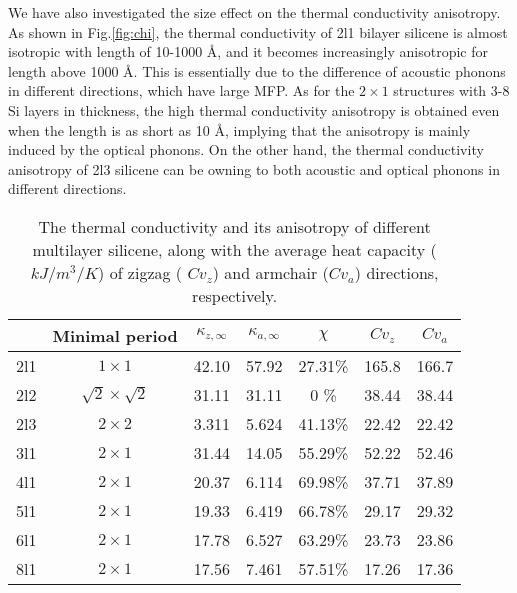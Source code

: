 \documentclass[aps,prb,twocolumn,showpacs,amsmath,amssymb]{revtex4-1}
\newcommand{\angstrom}{\mbox{\normalfont\AA}}
\begin{document}
We have also investigated the size effect on the thermal conductivity anisotropy. As shown in Fig.\ref{fig:chi}, the thermal conductivity of  2l1 bilayer silicene is almost isotropic with length of 10-1000 \angstrom, and it becomes increasingly anisotropic for length  above 1000  \angstrom. This is essentially due to the difference of acoustic phonons in different directions,  which have large MFP.  As for the $2\times1$ structures with 3-8 Si layers in thickness, the high thermal conductivity anisotropy is obtained even when the length is as short as 10 \angstrom, implying that the anisotropy is  mainly induced by the optical phonons. On the other hand, the thermal conductivity anisotropy of 2l3 silicene can be owning to both acoustic and  optical phonons in different directions.

\begin{table*}
  \caption{\label{tab:table1}
    The thermal conductivity and its anisotropy of different multilayer silicene, along with the average heat capacity ($kJ/m^3/K$) of zigzag ( $Cv_z$) and armchair ($Cv_a$) directions, respectively. }
  \begin{ruledtabular}
    \begin{tabular}{ccccccc}
          & Minimal period
          & $\kappa_{z,\infty}$
          & $\kappa_{a,\infty}$
          & $\chi$
          & $Cv_{z}$
          & $Cv_{a}$                                                           \\
      \hline
      2l1 & $1 \times 1$             & 42.10 & 57.92 & 27.31\% & 165.8 & 166.7 \\
      2l2 & $\sqrt{2}\times\sqrt{2}$ & 31.11 & 31.11 & 0    \% & 38.44 & 38.44 \\
      2l3 & $2 \times 2$             & 3.311 & 5.624 & 41.13\% & 22.42 & 22.42 \\
      3l1 & $2 \times 1$             & 31.44 & 14.05 & 55.29\% & 52.22 & 52.46 \\
      4l1 & $2 \times 1$             & 20.37 & 6.114 & 69.98\% & 37.71 & 37.89 \\
      5l1 & $2 \times 1$             & 19.33 & 6.419 & 66.78\% & 29.17 & 29.32 \\
      6l1 & $2 \times 1$             & 17.78 & 6.527 & 63.29\% & 23.73 & 23.86 \\
      8l1 & $2 \times 1$             & 17.56 & 7.461 & 57.51\% & 17.26 & 17.36 \\
    \end{tabular}
  \end{ruledtabular}
\end{table*}
\end{document}
